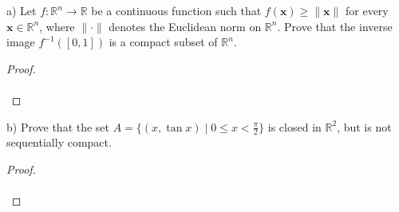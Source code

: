a) Let $f: \mathbb{R}^n \to \mathbb{R}$ be a continuous function such that $f(\textbf{x}) \ge \lVert \textbf{x} \rVert$
   for every $\textbf{x} \in \mathbb{R}^n$, where $\lVert \cdot \rVert$ denotes the Euclidean norm on $\mathbb{R}^n$.
   Prove that the inverse image $f^{-1}([0, 1])$ is a compact subset of $\mathbb{R}^n$.

\begin{proof}\renewcommand{\qedsymbol}{}\ \\\\
\end{proof}

\pagebreak

b) Prove that the set $A = \{(x, \tan{x}) \mid 0 \le x < \frac{\pi}{2} \}$ is closed in $\mathbb{R}^2$, but is not 
   sequentially compact.

\begin{proof}\renewcommand{\qedsymbol}{}\ \\\\
\end{proof}

